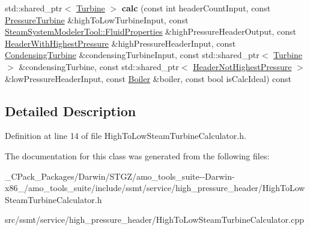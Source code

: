 \begin{DoxyCompactItemize}
\item 
\mbox{\label{class_high_to_low_steam_turbine_calculator_aaa08152db817144f5bfba90a858882bf}} 
std\+::shared\+\_\+ptr$<$ \hyperlink{class_turbine}{Turbine} $>$ {\bfseries calc} (const int header\+Count\+Input, const \hyperlink{class_pressure_turbine}{Pressure\+Turbine} \&high\+To\+Low\+Turbine\+Input, const \hyperlink{struct_steam_system_modeler_tool_1_1_fluid_properties}{Steam\+System\+Modeler\+Tool\+::\+Fluid\+Properties} \&high\+Pressure\+Header\+Output, const \hyperlink{class_header_with_highest_pressure}{Header\+With\+Highest\+Pressure} \&high\+Pressure\+Header\+Input, const \hyperlink{class_condensing_turbine}{Condensing\+Turbine} \&condensing\+Turbine\+Input, const std\+::shared\+\_\+ptr$<$ \hyperlink{class_turbine}{Turbine} $>$ \&condensing\+Turbine, const std\+::shared\+\_\+ptr$<$ \hyperlink{class_header_not_highest_pressure}{Header\+Not\+Highest\+Pressure} $>$ \&low\+Pressure\+Header\+Input, const \hyperlink{class_boiler}{Boiler} \&boiler, const bool is\+Calc\+Ideal) const
\end{DoxyCompactItemize}


\subsection{Detailed Description}


Definition at line 14 of file High\+To\+Low\+Steam\+Turbine\+Calculator.\+h.



The documentation for this class was generated from the following files\+:\begin{DoxyCompactItemize}
\item 
\+\_\+\+C\+Pack\+\_\+\+Packages/\+Darwin/\+S\+T\+G\+Z/amo\+\_\+tools\+\_\+suite-\/-\/\+Darwin-\/x86\+\_/amo\+\_\+tools\+\_\+suite/include/ssmt/service/high\+\_\+pressure\+\_\+header/High\+To\+Low\+Steam\+Turbine\+Calculator.\+h\item 
src/ssmt/service/high\+\_\+pressure\+\_\+header/High\+To\+Low\+Steam\+Turbine\+Calculator.\+cpp\end{DoxyCompactItemize}
